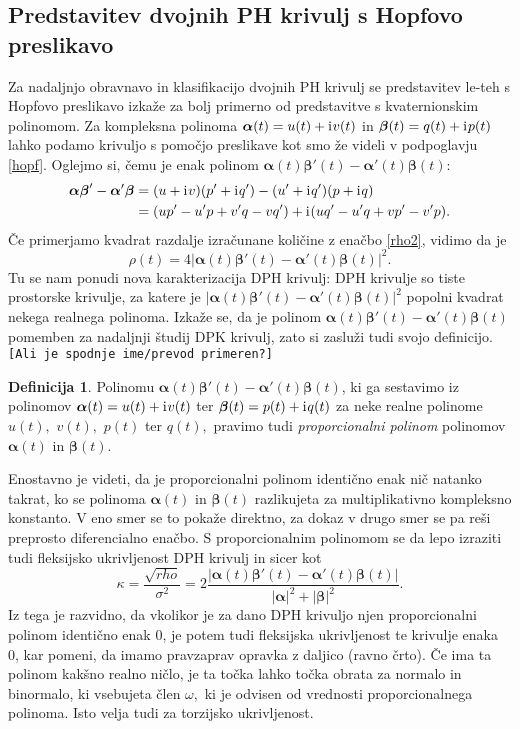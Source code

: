 \documentclass[12pt,a4paper,twoside]{article}
\newcommand{\iu}{\mathrm{i}\mkern1mu} %
\theoremstyle{definition} %
\newtheorem{definicija}{Definicija}[section]
\theoremstyle{plain} %
\numberwithin{equation}{section}  %
\newcommand{\balpha}{\boldsymbol \alpha}
\newcommand{\bbeta}{\boldsymbol \beta}
\begin{document}
\subsection{Predstavitev dvojnih PH krivulj s Hopfovo preslikavo}

Za nadaljnjo obravnavo in klasifikacijo dvojnih PH krivulj se predstavitev le-teh s Hopfovo preslikavo izkaže za bolj primerno od predstavitve s kvaternionskim polinomom. Za kompleksna polinoma $\balpha(t)=u(t)+\iu v(t)$ in $\bbeta(t)=q(t)+\iu p(t)$ lahko podamo krivuljo s pomočjo preslikave kot smo že videli v podpoglavju \ref{hopf}. Oglejmo si, čemu je enak polinom $\balpha(t)\bbeta'(t)-\balpha'(t)\bbeta(t):$
\begin{align}
	\balpha\bbeta'-\balpha'\bbeta&=(u+\iu v)(p'+\iu q')-(u'+\iu q')(p+\iu q) \nonumber \\
	&=(up'-u'p+v'q-vq')+\iu(uq'-u'q+vp'-v'p).
\end{align}
Če primerjamo kvadrat razdalje izračunane količine z enačbo \eqref{rho2}, vidimo da je
\begin{equation}
	\label{rho_propoly}
	\rho(t)=4|\balpha(t)\bbeta'(t)-\balpha'(t)\bbeta(t)|^2.
\end{equation}
Tu se nam ponudi nova karakterizacija DPH krivulj: DPH krivulje so tiste prostorske krivulje, za katere je $|\balpha(t)\bbeta'(t)-\balpha'(t)\bbeta(t)|^2$ popolni kvadrat nekega realnega polinoma. Izkaže se, da je polinom $\balpha(t)\bbeta'(t)-\balpha'(t)\bbeta(t)$ pomemben za nadaljnji študij DPK krivulj, zato si zasluži tudi svojo definicijo.\texttt{[Ali je spodnje ime/prevod primeren?]}
\begin{definicija}
	Polinomu $\balpha(t)\bbeta'(t)-\balpha'(t)\bbeta(t)$, ki ga sestavimo iz polinomov $\balpha(t)=u(t)+\iu v(t)$ ter $\bbeta(t)=p(t)+\iu q(t)$ za neke realne polinome $u(t),$ $v(t),$ $p(t)$ ter $q(t),$ pravimo tudi \emph{proporcionalni polinom} polinomov $\balpha(t)$ in $\bbeta(t).$
\end{definicija}
Enostavno je videti, da je proporcionalni polinom identično enak nič natanko takrat, ko se polinoma $\balpha(t)$ in $\bbeta(t)$ razlikujeta za multiplikativno kompleksno konstanto. V eno smer se to pokaže direktno, za dokaz v drugo smer se pa reši preprosto diferencialno enačbo.
S proporcionalnim polinomom se da lepo izraziti tudi fleksijsko ukrivljenost DPH krivulj in sicer kot
\begin{equation}
	\label{kappa_propoly}
	\kappa=\frac{\sqrt{rho}}{\sigma^2}=2\frac{|\balpha(t)\bbeta'(t)-\balpha'(t)\bbeta(t)|}{|\balpha|^2+|\bbeta|^2}.
\end{equation}
Iz tega je razvidno, da vkolikor je za dano DPH krivuljo njen proporcionalni polinom identično enak 0, je potem tudi fleksijska ukrivljenost te krivulje enaka 0, kar pomeni, da imamo pravzaprav opravka z daljico (ravno črto). Če ima ta polinom kakšno realno ničlo, je ta točka lahko točka obrata za normalo in binormalo, ki vsebujeta člen $\omega,$ ki je odvisen od vrednosti proporcionalnega polinoma. Isto velja tudi za torzijsko ukrivljenost.
\end{document}
